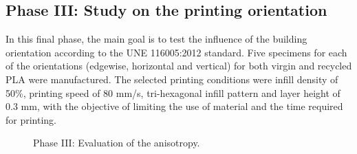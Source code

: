 \documentclass[]{interact}
\theoremstyle{plain}%
\theoremstyle{definition}
\theoremstyle{remark}
\begin{document}
\hypertarget{phase-iii-study-on-the-printing-orientation}{%
\subsection{Phase III: Study on the printing
orientation}\label{phase-iii-study-on-the-printing-orientation}}

In this final phase, the main goal is to test the influence of the
building orientation according to the UNE 116005:2012
\citep{Garcia-Dominguez2020} standard. Five specimens for each of the
orientations (edgewise, horizontal and vertical) for both virgin and
recycled PLA were manufactured. The selected printing conditions were
infill density of 50\%, printing speed of 80 mm/s, tri-hexagonal infill
pattern and layer height of 0.3 mm, with the objective of limiting the
use of material and the time required for printing.

\begin{figure}[!t]
\centering
{}

\caption{Phase III: Evaluation of the anisotropy.}
\end{figure}
\end{document}
